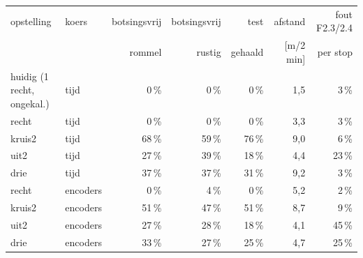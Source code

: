 \begin{tabular}{@{}llrrrrr@{}}
\toprule
opstelling & koers & botsingsvrij & botsingsvrij & test & afstand & fout F2.3/2.4 \\
 & & rommel & rustig & gehaald & [m/2 min] & per stop \\
\midrule
huidig (1 recht, ongekal.) & tijd & 0\,\% & 0\,\% & 0\,\% & 1{,}5 & 3\,\% \\
\midrule
recht & tijd & 0\,\% & 0\,\% & 0\,\% & 3{,}3 & 3\,\% \\
kruis2 & tijd & 68\,\% & 59\,\% & 76\,\% & 9{,}0 & 6\,\% \\
uit2 & tijd & 27\,\% & 39\,\% & 18\,\% & 4{,}4 & 23\,\% \\
drie & tijd & 37\,\% & 37\,\% & 31\,\% & 9{,}2 & 3\,\% \\
recht & encoders & 0\,\% & 4\,\% & 0\,\% & 5{,}2 & 2\,\% \\
kruis2 & encoders & 51\,\% & 47\,\% & 51\,\% & 8{,}7 & 9\,\% \\
uit2 & encoders & 27\,\% & 28\,\% & 18\,\% & 4{,}1 & 45\,\% \\
drie & encoders & 33\,\% & 27\,\% & 25\,\% & 4{,}7 & 25\,\% \\
\bottomrule
\end{tabular}
